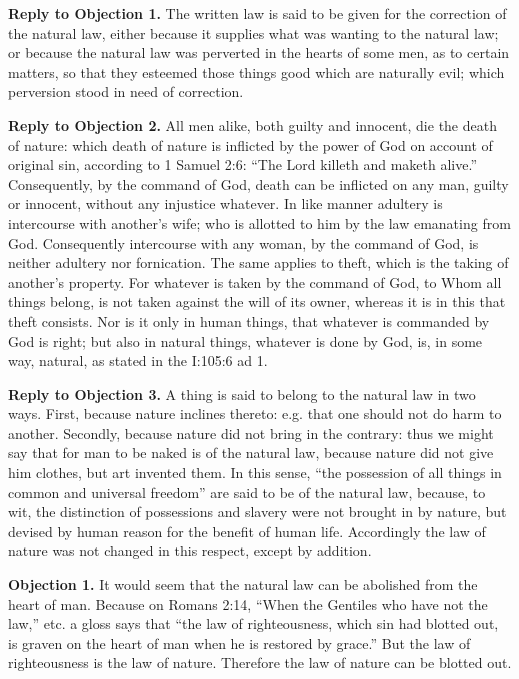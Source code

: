 \textbf{Reply to Objection 1.} The written law is said to be given for the correction of the natural law, either because it supplies what was wanting to the natural law; or because the natural law was perverted in the hearts of some men, as to certain matters, so that they esteemed those things good which are naturally evil; which perversion stood in need of correction.

\textbf{Reply to Objection 2.} All men alike, both guilty and innocent, die the death of nature: which death of nature is inflicted by the power of God on account of original sin, according to 1 Samuel 2:6: ``The Lord killeth and maketh alive.'' Consequently, by the command of God, death can be inflicted on any man, guilty or innocent, without any injustice whatever. In like manner adultery is intercourse with another's wife; who is allotted to him by the law emanating from God. Consequently intercourse with any woman, by the command of God, is neither adultery nor fornication. The same applies to theft, which is the taking of another's property. For whatever is taken by the command of God, to Whom all things belong, is not taken against the will of its owner, whereas it is in this that theft consists. Nor is it only in human things, that whatever is commanded by God is right; but also in natural things, whatever is done by God, is, in some way, natural, as stated in the I:105:6 ad 1.

\textbf{Reply to Objection 3.} A thing is said to belong to the natural law in two ways. First, because nature inclines thereto: e.g. that one should not do harm to another. Secondly, because nature did not bring in the contrary: thus we might say that for man to be naked is of the natural law, because nature did not give him clothes, but art invented them. In this sense, ``the possession of all things in common and universal freedom'' are said to be of the natural law, because, to wit, the distinction of possessions and slavery were not brought in by nature, but devised by human reason for the benefit of human life. Accordingly the law of nature was not changed in this respect, except by addition.


\textbf{Objection 1.} It would seem that the natural law can be abolished from the heart of man. Because on Romans 2:14, ``When the Gentiles who have not the law,'' etc. a gloss says that ``the law of righteousness, which sin had blotted out, is graven on the heart of man when he is restored by grace.'' But the law of righteousness is the law of nature. Therefore the law of nature can be blotted out.

